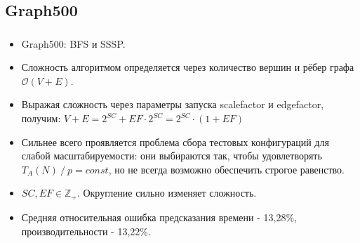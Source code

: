 \documentclass[unicode, t, 11pt]{beamer}%
\begin{document}
		\subsection{Graph500}
		\begin{frame}
			\frametitle{\insertsection}
			\framesubtitle{\insertsubsection}
			\begin{itemize}[label = \(\bullet\)]
				\item Graph500: BFS и SSSP.
				\item Сложность алгоритмом определяется через количество вершин и рёбер графа \(\mathcal{O}(V + E)\).
				\item Выражая сложность через параметры запуска scalefactor и edgefactor, получим: \(V + E = 2^{SC} + EF \cdot 2^{SC} = 2^{SC} \cdot (1 + EF) \)
				\item Сильнее всего проявляется проблема сбора тестовых конфигураций для слабой масштабируемости: они выбираются так, чтобы удовлетворять \(T_A(N)\:/\:p = const\), но не всегда возможно обеспечить строгое равенство.
				\item \(SC, EF \in \mathbb{Z}_+\). Округление сильно изменяет сложность.
				\item Средняя относительная ошибка предсказания времени - 13,28\%, производительности - 13,22\%.
			\end{itemize}

		\end{frame}
\end{document}
